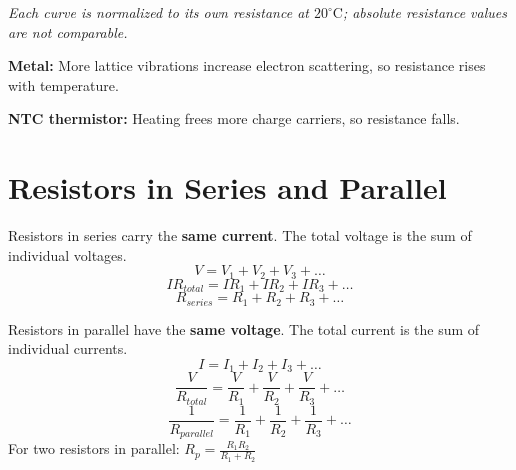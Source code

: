 \begin{diagbox}
\begin{center}
\end{center}
{\footnotesize\centering
\textit{Each curve is normalized to its own resistance at $20^\circ\mathrm{C}$;
absolute resistance values are not comparable.}\par}
\smallskip
\noindent
\begin{minipage}[t]{0.48\linewidth}
  \footnotesize\raggedright
  \textcolor{codexblue}{\textbf{Metal:}} More lattice vibrations increase
  electron scattering, so resistance rises with temperature.
\end{minipage}\hfill
\begin{minipage}[t]{0.48\linewidth}
  \footnotesize\raggedright
  \textcolor{codexred}{\textbf{NTC thermistor:}} Heating frees more charge
  carriers, so resistance falls.
\end{minipage}
\end{diagbox}

\section{Resistors in Series and Parallel}

\begin{lawbox}
Resistors in series carry the \textbf{same current}.
The total voltage is the sum of individual voltages.
\[
  V = V_1 + V_2 + V_3 + \ldots
\]
\[
  IR_{total} = IR_1 + IR_2 + IR_3 + \ldots
\]
\[
  \boxed{R_{series} = R_1 + R_2 + R_3 + \ldots}
\]
\end{lawbox}

\begin{lawbox}
Resistors in parallel have the \textbf{same voltage}.
The total current is the sum of individual currents.
\[
  I = I_1 + I_2 + I_3 + \ldots
\]
\[
  \frac{V}{R_{total}} = \frac{V}{R_1}
  + \frac{V}{R_2} + \frac{V}{R_3} + \ldots
\]
\[
  \boxed{\frac{1}{R_{parallel}} = \frac{1}{R_1}
  + \frac{1}{R_2} + \frac{1}{R_3} + \ldots}
\]
For two resistors in parallel:
$R_p = \frac{R_1 R_2}{R_1 + R_2}$
\end{lawbox}

